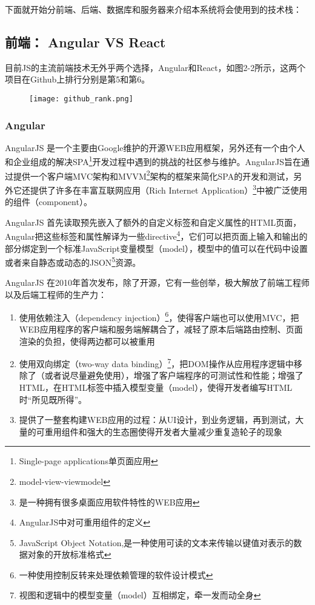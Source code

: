 下面就开始分前端、后端、数据库和服务器来介绍本系统将会使用到的技术栈：
\subsection{前端： Angular VS React}
目前JS的主流前端技术无外乎两个选择，Angular和React，如图2-2所示，这两个项目在Github上排行分别是第5和第6。
\begin{figure}[!htp]
 \centering
 \texttt{[image: github\_rank.png]}
\end{figure}
\subsubsection{Angular}
AngularJS 是一个主要由Google维护的开源WEB应用框架，另外还有一个由个人和企业组成的解决SPA\footnote{Single-page applications单页面应用}开发过程中遇到的挑战的社区参与维护。AngularJS旨在通过提供一个客户端MVC架构和MVVM\footnote{model-view-viewmodel}架构的框架来简化SPA的开发和测试，另外它还提供了许多在丰富互联网应用（Rich Internet Application）\footnote{是一种拥有很多桌面应用软件特性的WEB应用 }中被广泛使用的组件（component）。

AngularJS 首先读取预先嵌入了额外的自定义标签和自定义属性的HTML页面，Angular把这些标签和属性解译为一些directive\footnote{AngularJS中对可重用组件的定义}，它们可以把页面上输入和输出的部分绑定到一个标准JavaScript变量模型（model），模型中的值可以在代码中设置或者来自静态或动态的JSON\footnote{JavaScript Object Notation,是一种使用可读的文本来传输以键值对表示的数据对象的开放标准格式}资源。

AngularJS 在2010年首次发布，除了开源，它有一些创举，极大解放了前端工程师以及后端工程师的生产力：
\begin{enumerate}
  \item 使用依赖注入（dependency injection）\footnote{一种使用控制反转来处理依赖管理的软件设计模式}，使得客户端也可以使用MVC，把WEB应用程序的客户端和服务端解耦合了，减轻了原本后端路由控制、页面渲染的负担，使得两边都可以被重用
  \item 使用双向绑定（two-way data binding）\footnote{视图和逻辑中的模型变量（model）互相绑定，牵一发而动全身}，把DOM操作从应用程序逻辑中移除了（或者说尽量避免使用），增强了客户端程序的可测试性和性能；增强了HTML，在HTML标签中插入模型变量（model），使得开发者编写HTML时“所见既所得”。
  \item 提供了一整套构建WEB应用的过程：从UI设计，到业务逻辑，再到测试，大量的可重用组件和强大的生态圈使得开发者大量减少重复造轮子的现象
\end{enumerate}


